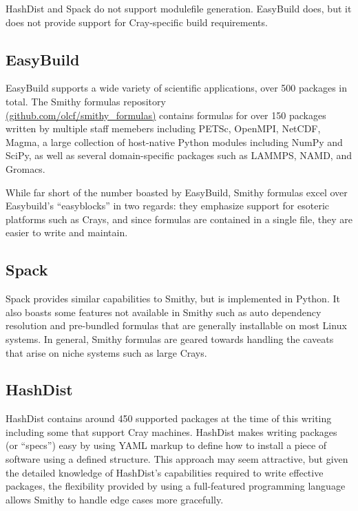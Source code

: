 \documentclass{acm_proc_article-sp}
\begin{document}
HashDist and Spack do not support modulefile generation. EasyBuild does, but it
does not provide support for Cray-specific build requirements.

\subsection{EasyBuild}

EasyBuild supports a wide variety of scientific applications, over 500 packages
in total. The Smithy formulas repository \\
\href{http://github.com/olcf/smithy\_formulas}{(github.com/olcf/smithy\_formulas)}
contains formulas for over 150 packages written by multiple staff memebers
including PETSc, OpenMPI, NetCDF, Magma, a large collection of host-native
Python modules including NumPy and SciPy, as well as several domain-specific
packages such as LAMMPS, NAMD, and Gromacs.

While far short of the number boasted by EasyBuild, Smithy formulas excel over
Easybuild's ``easyblocks'' in two regards: they emphasize support for esoteric
platforms such as Crays, and since formulas are contained in a single file, they
are easier to write and maintain.

\subsection{Spack}

Spack provides similar capabilities to Smithy, but is implemented in Python. It
also boasts some features not available in Smithy such as
auto dependency resolution and pre-bundled formulas
that are generally installable on most Linux systems. In general, Smithy
formulas are geared towards handling the caveats that arise on niche systems
such as large Crays.

\subsection{HashDist}

HashDist contains around 450 supported packages at the time of this writing
including some that support Cray machines.  HashDist makes writing packages (or
``specs'') easy by using YAML markup to define how to install a piece of software
using a defined structure. This approach may seem attractive, but given the
detailed knowledge of HashDist's capabilities required to write effective
packages, the
flexibility provided by using a full-featured programming language allows Smithy
to handle edge cases more gracefully.
\end{document}
